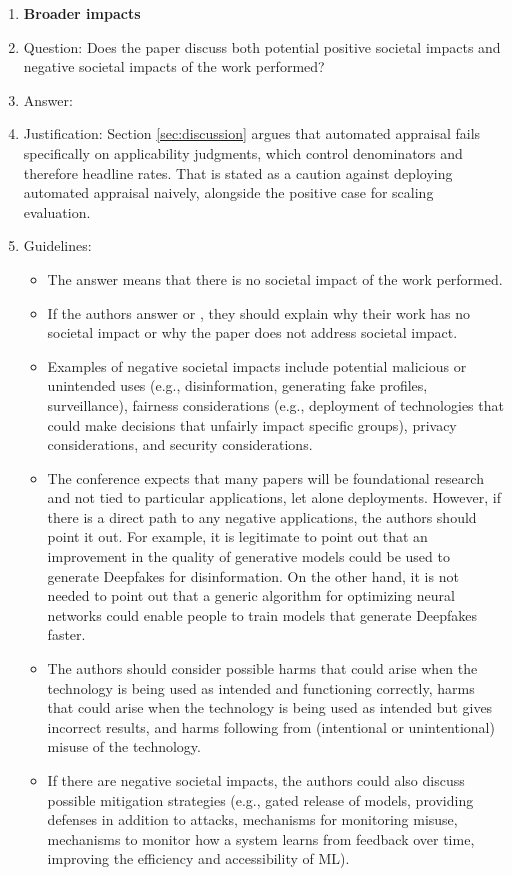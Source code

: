\documentclass{article}
\begin{document}
\begin{enumerate}
\item {\bf Broader impacts}
    \item[] Question: Does the paper discuss both potential positive societal impacts and negative societal impacts of the work performed?
    \item[] Answer: \answerYes{}
    \item[] Justification: Section \ref{sec:discussion} argues that automated appraisal fails specifically on applicability judgments, which control denominators and therefore headline rates. That is stated as a caution against deploying automated appraisal naively, alongside the positive case for scaling evaluation.
    \item[] Guidelines:
    \begin{itemize}
        \item The answer \answerNA{} means that there is no societal impact of the work performed.
        \item If the authors answer \answerNA{} or \answerNo, they should explain why their work has no societal impact or why the paper does not address societal impact.
        \item Examples of negative societal impacts include potential malicious or unintended uses (e.g., disinformation, generating fake profiles, surveillance), fairness considerations (e.g., deployment of technologies that could make decisions that unfairly impact specific groups), privacy considerations, and security considerations.
        \item The conference expects that many papers will be foundational research and not tied to particular applications, let alone deployments. However, if there is a direct path to any negative applications, the authors should point it out. For example, it is legitimate to point out that an improvement in the quality of generative models could be used to generate Deepfakes for disinformation. On the other hand, it is not needed to point out that a generic algorithm for optimizing neural networks could enable people to train models that generate Deepfakes faster.
        \item The authors should consider possible harms that could arise when the technology is being used as intended and functioning correctly, harms that could arise when the technology is being used as intended but gives incorrect results, and harms following from (intentional or unintentional) misuse of the technology.
        \item If there are negative societal impacts, the authors could also discuss possible mitigation strategies (e.g., gated release of models, providing defenses in addition to attacks, mechanisms for monitoring misuse, mechanisms to monitor how a system learns from feedback over time, improving the efficiency and accessibility of ML).
    \end{itemize}
    

\end{enumerate}
\end{document}
